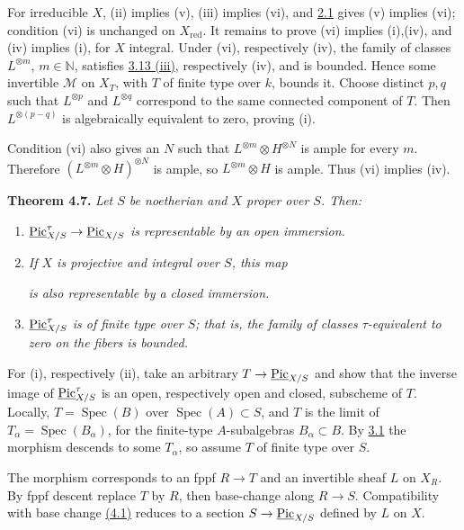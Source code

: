 For irreducible \(X\), (ii) implies (v), (iii) implies (vi), and \hyperlink{sga6.e13.para.2-1}{2.1}
gives (v) implies (vi); condition (vi) is unchanged on
\(X_{\mathrm{red}}\). It remains to prove (vi) implies (i),(iv), and
(iv) implies (i), for \(X\) integral. Under (vi), respectively (iv), the
family of classes \(L^{\otimes m}\), \(m\in\mathbb N\), satisfies \hyperlink{sga6.e13.thm.3-13}{3.13
(iii)}, respectively (iv), and is bounded. Hence some invertible
\(\mathcal M\) on \(X_T\), with \(T\) of finite type over \(k\), bounds
it. Choose distinct \(p,q\) such that \(L^{\otimes p}\) and
\(L^{\otimes q}\) correspond to the same connected component of \(T\).
Then \(L^{\otimes(p-q)}\) is algebraically equivalent to zero, proving
(i).

Condition (vi) also gives an \(N\) such that
\(L^{\otimes m}\otimes H^{\otimes N}\) is ample for every \(m\).
Therefore \((L^{\otimes m}\otimes H)^{\otimes N}\) is ample, so
\(L^{\otimes m}\otimes H\) is ample. Thus (vi) implies (iv).

\textbf{Theorem 4.7.} \emph{Let \(S\) be noetherian and \(X\) proper over
\(S\). Then:}
\begin{enumerate}[label=(\roman*)]
\item \emph{\(\underline{\operatorname{Pic}}^{\tau}_{X/S}\to
\underline{\operatorname{Pic}}_{X/S}\) is representable by an open immersion.}
\item \emph{If \(X\) is projective and integral over \(S\), this map}

\emph{is also representable by a closed immersion.}
\item \emph{\(\underline{\operatorname{Pic}}^{\tau}_{X/S}\) is of finite type over
\(S\); that is, the family of classes \(\tau\)-equivalent to zero on the
fibers is bounded.}
\end{enumerate}

For (i), respectively (ii), take an arbitrary
\(T\to\underline{\operatorname{Pic}}_{X/S}\) and show that the inverse image of
\(\underline{\operatorname{Pic}}^{\tau}_{X/S}\) is an open, respectively open and
closed, subscheme of \(T\). Locally, \(T=\operatorname{Spec}(B)\) over
\(\operatorname{Spec}(A)\subset S\), and \(T\) is the limit of
\(T_\alpha=\operatorname{Spec}(B_\alpha)\), for the finite-type
\(A\)-subalgebras \(B_\alpha\subset B\). By \hyperlink{sga6.e13.lem.3-1}{3.1} the morphism descends to
some \(T_\alpha\), so assume \(T\) of finite type over \(S\).

The morphism corresponds to an fppf \(R\to T\) and an invertible sheaf
\(L\) on \(X_R\). By fppf descent replace \(T\) by \(R\), then base-change
along \(R\to S\). Compatibility with base change \hyperlink{sga6.e13.para.4-1}{(4.1)} reduces to a
section \(S\to\underline{\operatorname{Pic}}_{X/S}\) defined by \(L\) on \(X\).


